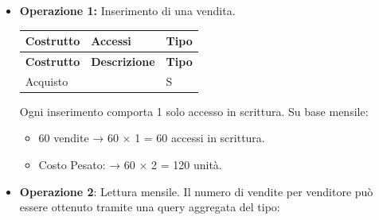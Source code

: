 \begin{itemize}
    \item{ \textbf{Operazione 1:} Inserimento di una vendita.

       \begin{longtable}{|
            >{\centering\arraybackslash}m{2cm}|
            >{\centering\arraybackslash}m{1.5cm}|
            >{\centering\arraybackslash}m{1cm}|
            }
            
            \hline
            \textbf{Costrutto} & \textbf{Accessi} & \textbf{Tipo} \\
            \hline
            \endfirsthead
            
            \hline
            \textbf{Costrutto} & \textbf{Descrizione} & \textbf{Tipo} \\
            \hline
            \endhead
               
            Acquisto & 1 & S \\
            \hline
            
        \end{longtable}

        Ogni inserimento comporta 1 solo accesso in scrittura.
        Su base mensile:
        \begin{itemize}
            \renewcommand{\labelitemii}{$\circ$}
            \item 60 vendite → 60 × 1 = 60 accessi in scrittura.
            \item Costo Pesato: → 60 × 2 = 120 unità.
        \end{itemize}
        
    }
    
    \vspace{0.5cm}
    \item {\textbf{Operazione 2}: Lettura mensile.
        \newline Il numero di vendite per venditore può essere ottenuto tramite una query aggregata del tipo:

         \vspace{0.5cm}
        \begin{center}
        \end{center}
        \vspace{0.5cm}
         
}
\end{itemize}
